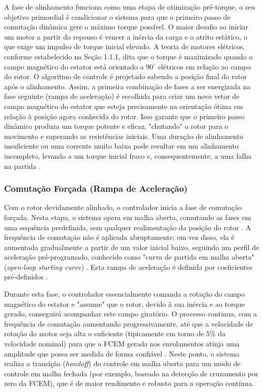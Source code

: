  A fase de alinhamento funciona como uma etapa de otimização pré-torque, o seu objetivo primordial é condicionar o sistema para que o primeiro passo de comutação dinâmica gere o máximo torque possível. O maior desafio ao iniciar um motor a partir do repouso é vencer a inércia da carga e o atrito estático, o que exige um impulso de torque inicial elevado. A teoria de motores elétricos, conforme estabelecido na Seção 1.1.1, dita que o torque é maximizado quando o campo magnético do estator está orientado a $90^{\circ}$ elétricos em relação ao campo do rotor. O algoritmo de controle é projetado sabendo a posição final do rotor após o alinhamento. Assim, a primeira combinação de fases a ser energizada na fase seguinte (rampa de aceleração) é escolhida para criar um novo vetor de campo magnético do estator que esteja precisamente na orientação ótima em relação à posição agora conhecida do rotor. Isso garante que o primeiro passo dinâmico produza um torque potente e eficaz, "chutando" o rotor para o movimento e superando as resistências iniciais. Uma duração de alinhamento insuficiente ou uma corrente muito baixa pode resultar em um alinhamento incompleto, levando a um torque inicial fraco e, consequentemente, a uma falha na partida \cite{ti2022minimizing}.

\subsubsection{Comutação Forçada (Rampa de Aceleração)}

Com o rotor devidamente alinhado, o controlador inicia a fase de comutação forçada. Nesta etapa, o sistema opera em malha aberta, comutando as fases em uma sequência predefinida, sem qualquer realimentação da posição do rotor \cite{nxp2023sensorless}. A frequência de comutação não é aplicada abruptamente; em vez disso, ela é aumentada gradualmente a partir de um valor inicial baixo, seguindo um perfil de aceleração pré-programado, conhecido como "curva de partida em malha aberta" (\textit{open-loop starting curve}) \cite{ti2022minimizing}. Esta rampa de aceleração é definida por coeficientes pré-definidos \cite{ti2022minimizing}.

Durante esta fase, o controlador essencialmente comanda a rotação do campo magnético do estator e "assume" que o rotor, devido à sua inércia e ao torque gerado, conseguirá acompanhar este campo giratório. O processo continua, com a frequência de comutação aumentando progressivamente, até que a velocidade de rotação do motor seja alta o suficiente (tipicamente em torno de $5\%$ da velocidade nominal) para que a FCEM gerada nos enrolamentos atinja uma amplitude que possa ser medida de forma confiável \cite{ti2022minimizing, nxp2023sensorless}. Neste ponto, o sistema realiza a transição (\textit{handoff}) do controle em malha aberta para um modo de controle em malha fechada (por exemplo, baseado na detecção de cruzamento por zero da FCEM), que é de maior rendimento e robusto para a operação contínua.

